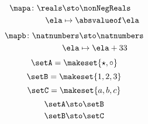 \begin{forslides}
    \begin{equation}
        \label{eq:quiz_inj_1}
        \begin{aligned}
            \mapa\colon \reals & \sto \nonNegReals \\
            \ela               & \mapsto \absvalueof \ela
        \end{aligned}
    \end{equation}
    \begin{equation}
        \label{eq:quiz_inj_2}
        \begin{aligned}
            \mapb\colon \natnumbers & \sto \natnumbers \\
            \ela                    & \mapsto \ela + 33
        \end{aligned}
    \end{equation}
    \begin{equation}
        \label{eq:quiz_isos_1}
        \setA=\makeset{\star, \circ}
    \end{equation}
    \begin{equation}
        \label{eq:quiz_isos_2}
        \setB=\makeset{1, 2, 3}
    \end{equation}
    \begin{equation}
        \label{eq:quiz_isos_3}
        \setC=\makeset{a, b, c}
    \end{equation}
    \begin{equation}
        \label{eq:quiz_isos_4}
        \setA \sto \setB
    \end{equation}
    \begin{equation}
        \label{eq:quiz_isos_5}
        \setB \sto \setC
    \end{equation}
\end{forslides}

